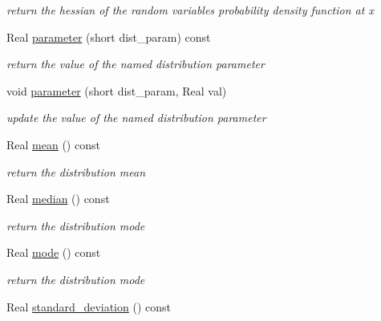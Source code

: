 \begin{DoxyCompactItemize}
\begin{DoxyCompactList}\small\item\em return the hessian of the random variable\textquotesingle{}s probability density function at x \end{DoxyCompactList}\item 
Real \hyperlink{classPecos_1_1TriangularRandomVariable_aa891dab1ae9a225f493e3a0e5032b778}{parameter} (short dist\+\_\+param) const \label{classPecos_1_1TriangularRandomVariable_aa891dab1ae9a225f493e3a0e5032b778}

\begin{DoxyCompactList}\small\item\em return the value of the named distribution parameter \end{DoxyCompactList}\item 
void \hyperlink{classPecos_1_1TriangularRandomVariable_ae8e123224f588aee676d5d56d5ca900d}{parameter} (short dist\+\_\+param, Real val)\label{classPecos_1_1TriangularRandomVariable_ae8e123224f588aee676d5d56d5ca900d}

\begin{DoxyCompactList}\small\item\em update the value of the named distribution parameter \end{DoxyCompactList}\item 
Real \hyperlink{classPecos_1_1TriangularRandomVariable_a962ffe5a3593be370d5c883365c060f4}{mean} () const \label{classPecos_1_1TriangularRandomVariable_a962ffe5a3593be370d5c883365c060f4}

\begin{DoxyCompactList}\small\item\em return the distribution mean \end{DoxyCompactList}\item 
Real \hyperlink{classPecos_1_1TriangularRandomVariable_ae1fff19ce29a79d657043a598523635d}{median} () const \label{classPecos_1_1TriangularRandomVariable_ae1fff19ce29a79d657043a598523635d}

\begin{DoxyCompactList}\small\item\em return the distribution mode \end{DoxyCompactList}\item 
Real \hyperlink{classPecos_1_1TriangularRandomVariable_a72d3d6926edd929cb3f8e12baa655f70}{mode} () const \label{classPecos_1_1TriangularRandomVariable_a72d3d6926edd929cb3f8e12baa655f70}

\begin{DoxyCompactList}\small\item\em return the distribution mode \end{DoxyCompactList}\item 
Real \hyperlink{classPecos_1_1TriangularRandomVariable_a6a4ed9624d511f8a4e4f509c82cb0706}{standard\+\_\+deviation} () const \label{classPecos_1_1TriangularRandomVariable_a6a4ed9624d511f8a4e4f509c82cb0706}


\end{DoxyCompactItemize}
